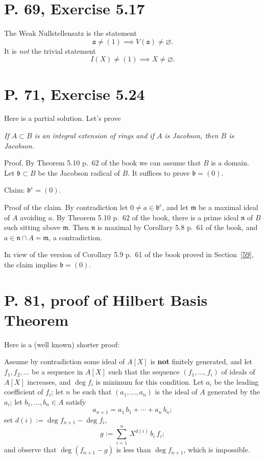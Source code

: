 \documentclass[parskip=half]{scrartcl}%
\newcommand{\oo}{\operatorname}
\newcommand{\mf}{\mathfrak}
\begin{document}
\section{P. 69, Exercise 5.17}%

The Weak Nullstellensatz is the statement
$$
\mf a\ne(1)\implies V(\mf a)\ne\varnothing.
$$ 
It is \emph{not} the trivial statement 
$$
I(X)\ne(1)\implies X\ne\varnothing.
$$

\section{P. 71, Exercise 5.24}%

Here is a partial solution. Let's prove 

\emph{If $A\subset B$ is an integral extension of rings and if $A$ is Jacobson, then $B$ is Jacobson.}

Proof. By Theorem 5.10 p.~62 of the book we can assume that $B$ is a domain. Let $\mf b\subset B$ be the Jacobson radical of $B$. It suffices to prove $\mf b=(0)$.

Claim: $\mf b^{\oo c}=(0)$. 

Proof of the claim. By contradiction let $0\ne a\in\mf b^{\oo c}$, and let $\mf m$ be a maximal ideal of $A$ avoiding $a$. By Theorem 5.10 p.~62 of the book, there is a prime ideal $\mf n$ of $B$ such sitting above $\mf m$. Then $\mf n$ is maximal by Corollary 5.8 p.~61 of the book, and $a\in\mf n\cap A=\mf m$, a contradiction.

In view of the version of Corollary 5.9 p.~61 of the book proved in Section~\ref{59}, the claim implies $\mf b=(0)$.

\section{P. 81, proof of Hilbert Basis Theorem}%

Here is a (well known) shorter proof:

Assume by contradiction some ideal %
of $A[X]$ is \textbf{not} finitely generated, and let $f_1,f_2,\dots$ be a sequence in $A[X]$ such that the sequence $(f_1,\dots,f_i)$ of ideals of $A[X]$ increases, and $\deg f_i$ is minimum for this condition. Let $a_i$ be the leading coefficient of $f_i$; let $n$ be such that $(a_1,\dots,a_n)$ is the ideal of $A$ generated by the $a_i$; let $b_1,\dots,b_n\in A$ satisfy 
$$
a_{n+1}=a_1\,b_1+\cdots+a_n\,b_n;
$$ 
set $d(i):=\deg f_{n+1}-\deg f_i$, 
$$
g:=\sum_{i=1}^n\,X^{d(i)}\,b_i\,f_i;
$$ 
and observe that $\deg(f_{n+1}-g)$ is less than $\deg f_{n+1}$, which is impossible.
\end{document}
